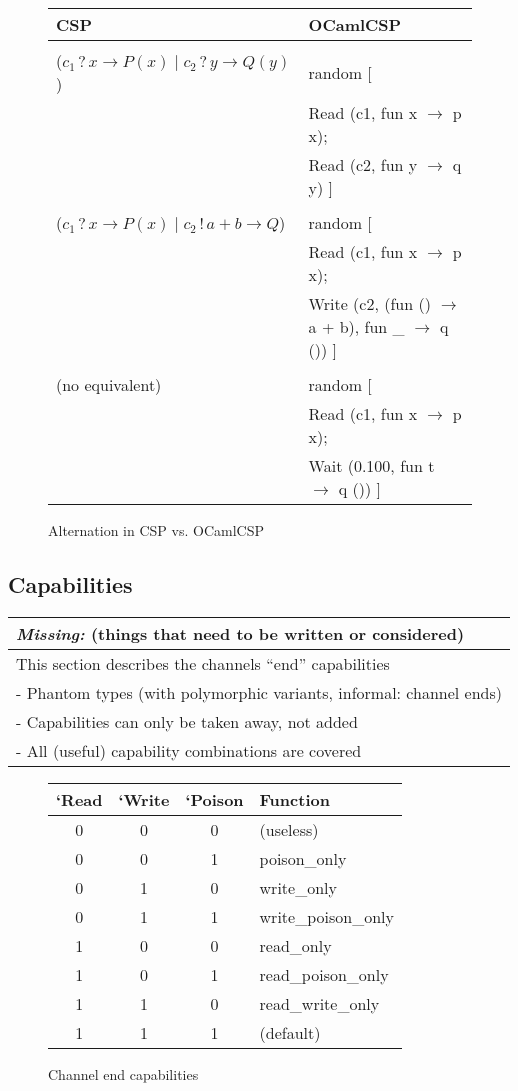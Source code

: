 \documentclass[11pt,oneside,a4paper]{article}
\newcommand{\missing}[1]{
\begin{tabular}{|p{11cm}|}
\hline
\emph{Missing:} {\scriptsize (things that need to be written or considered)} \\
\hline
#1
\hline
\end{tabular}
}
\begin{document}
\begin{figure}[h]
\centering
\begin{tabular}{l|l}
CSP & OCamlCSP \\
\hline
& \\
($c_1\,?\,x \to P(x) \mid c_2\,?\,y \to Q(y)$) & random [ \\
& \quad Read (c1, fun x $\to$ p x); \\
& \quad Read (c2, fun y $\to$ q y) ] \\
& \\
($c_1\,?\,x \to P(x) \mid c_2\,!\,a+b \to Q$) & random [ \\
& \quad Read (c1, fun x $\to$ p x); \\
& \quad Write (c2, (fun () $\to$ a + b), fun \_ $\to$ q ()) ] \\
& \\
(no equivalent) & random [ \\
& \quad Read (c1, fun x $\to$ p x); \\
& \quad Wait (0.100, fun t $\to$ q ()) ] \\
\end{tabular}
\caption{Alternation in CSP vs. OCamlCSP}
\label{channel-alternation}
\end{figure}

\subsection{Capabilities}
\missing{
This section describes the channels ``end'' capabilities \\
- Phantom types (with polymorphic variants, informal: channel ends) \\
- Capabilities can only be taken away, not added \\
- All (useful) capability combinations are covered \\
}

\begin{figure}[h]
\centering
\begin{tabular}{c|c|c|l}
`Read & `Write & `Poison & Function \\
\hline
0 & 0 & 0 & (useless) \\
0 & 0 & 1 & poison\_only \\
0 & 1 & 0 & write\_only \\
0 & 1 & 1 & write\_poison\_only \\
1 & 0 & 0 & read\_only \\
1 & 0 & 1 & read\_poison\_only \\
1 & 1 & 0 & read\_write\_only \\
1 & 1 & 1 & (default) \\
\end{tabular}
\caption{Channel end capabilities}
\label{channel-capabilities}
\end{figure}
\end{document}
